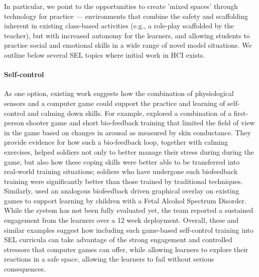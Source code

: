 \documentclass[prodmode,acmtochi]{acmsmall}
\begin{document}
In particular, we point to the opportunities to create 'mixed spaces' through technology for practice --- environments that combine the safety and scaffolding inherent in existing class-based activities (e.g., a role-play scaffolded by the teacher), but with increased autonomy for the learners, and allowing students to practise social and emotional skills in a wide range of novel model situations. We outline below several SEL topics where initial work in HCI exists. 

\paragraph{Self-control} As one option, existing work suggests how the combination of physiological sensors and a computer game could support the practice and learning of self-control and calming down skills. For example,  explored a combination of a first-person shooter game and short bio-feedback training that limited the field of view in the game based on changes in arousal as measured by skin conductance. They provide evidence for how such a bio-feedback loop, together with calming exercises, helped soldiers not only to better manage their stress during during the game, but also how these coping skills were better able to be transferred into real-world training situations; soldiers who have undergone such biofeedback training were significantly better than those trained by traditional techniques. Similarly,  used an analogous biofeedback driven graphical overlay on existing games to support learning by children with a Fetal Alcohol Spectrum Disorder. While the system has not been fully evaluated yet, the team reported a sustained engagement from the learners over a 12 week deployment. Overall, these and similar examples suggest how including such game-based self-control training into SEL curricula can take advantage of the strong engagement and controlled stressors that computer games can offer, while allowing learners to explore their reactions in a safe space, allowing the learners to fail without serious consequences.  
\end{document}
